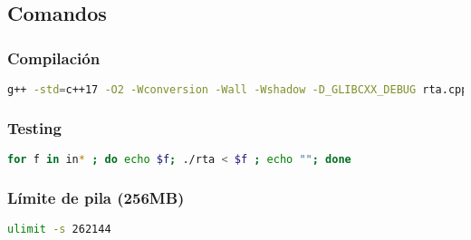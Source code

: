 
\subsection{Comandos}

\subsubsection*{Compilación}

\begin{lstlisting}[language=bash]
g++ -std=c++17 -O2 -Wconversion -Wall -Wshadow -D_GLIBCXX_DEBUG rta.cpp -o rta 
\end{lstlisting}

\subsubsection*{Testing}

\begin{lstlisting}[language=bash]
for f in in* ; do echo $f; ./rta < $f ; echo ""; done
\end{lstlisting}

\subsubsection*{Límite de pila (256MB)}

\begin{lstlisting}[language=bash]
ulimit -s 262144
\end{lstlisting}
